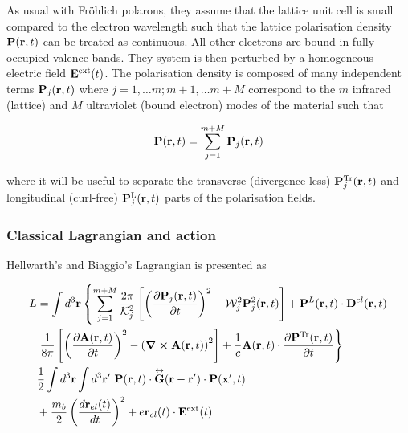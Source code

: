 As usual with Fr\"ohlich polarons, they assume that the lattice unit cell is small compared to the electron wavelength such that the lattice polarisation density $\vb{P}(\vb{r}, t)$ can be treated as continuous. All other electrons are bound in fully occupied valence bands. They system is then perturbed by a homogeneous electric field $\vb{E}^{\text{ext}}(t)$. The polarisation density is composed of many independent terms $\vb{P}_j(\vb{r}, t)$ where $j = 1, \dots m ; m + 1, \dots m + M$ correspond to the $m$ infrared (lattice) and $M$ ultraviolet (bound electron) modes of the material such that

\begin{equation}
    \vb{P}(\vb{r}, t) = \sum_{j = 1}^{m + M} \vb{P}_j(\vb{r}, t)
\end{equation}

where it will be useful to separate the transverse (divergence-less) $\vb{P}_j^{\text{Tr}}(\vb{r}, t)$ and longitudinal (curl-free) $\vb{P}_j^{\text{L}}(\vb{r}, t)$ parts of the polarisation fields.

\subsubsection{Classical Lagrangian and action}
\label{subsubsec:2-3-3-1}

Hellwarth's and Biaggio's Lagrangian is presented as

\begin{equation} \label{eqn:hi_lag}
    \begin{aligned}
        L &= \int d^3 \vb{r} \left\{ \sum_{j = 1}^{m+M} \frac{2\pi}{\mathcal{K}_j^2} \left[ \left( \frac{\partial \vb{P}_j(\vb{r}, t)}{\partial t} \right)^2 - \mathcal{W}_j^2 \vb{P}_j^2(\vb{r}, t)\right] + \vb{P}^L(\vb{r}, t) \cdot \vb{D}^{el}(\vb{r}, t) \right. \\
        &\left. \frac{1}{8\pi} \left[ \left( \frac{\partial \vb{A}(\vb{r}, t)}{\partial t} \right)^2 - \left( \curl{\vb{A}(\vb{r}, t)} \right)^2 \right] + \frac{1}{c} \vb{A}(\vb{r}, t) \cdot \frac{\partial \vb{P}^{\text{Tr}}(\vb{r}, t)}{\partial t} \right\} \\
        &\frac{1}{2} \int d^3\vb{r} \int d^3\vb{r'}\ \vb{P}(\vb{r}, t) \cdot \overset{\leftrightarrow}{\vb{G}}(\vb{r} - \vb{r'}) \cdot \vb{P}(\vb{x'}, t) \\
        &+\frac{m_b}{2} \left( \frac{d \vb{r}_{el}(t)}{dt} \right)^2 + e \vb{r}_{el}(t) \cdot \vb{E}^{\text{ext}}(t)
    \end{aligned}
\end{equation}

